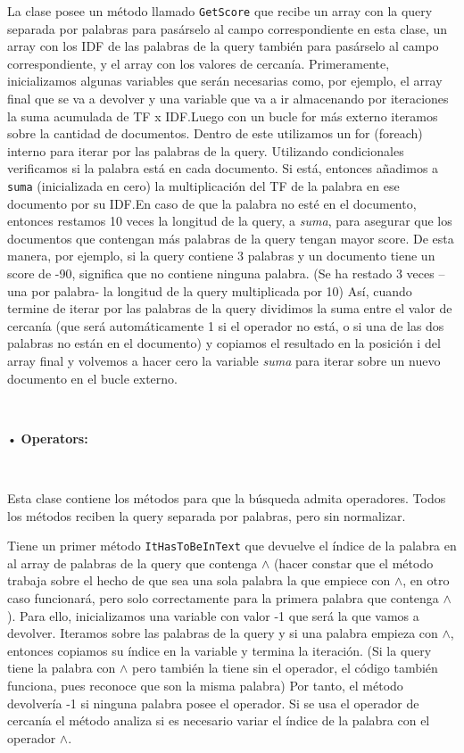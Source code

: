 \documentclass{article}
\begin{document}
La clase posee un método llamado {\texttt{GetScore}} que recibe un array con la query separada por
palabras para pasárselo al campo correspondiente en esta clase, un array con los IDF de las
palabras de la query también para pasárselo al campo correspondiente, y el array con los
valores de cercanía. Primeramente, inicializamos algunas variables que serán necesarias
como, por ejemplo, el array final que se va a devolver y una variable que va a ir almacenando
por iteraciones la suma acumulada de TF x IDF.Luego con un bucle for más externo iteramos
sobre la cantidad de documentos. Dentro de este utilizamos un for (foreach) interno para iterar
por las palabras de la query. Utilizando condicionales verificamos si la palabra está en cada
documento. Si está, entonces añadimos a {\texttt{suma}} (inicializada en cero) la multiplicación del TF
de la palabra en ese documento por su IDF.En caso de que la palabra no esté en el documento,
entonces restamos 10 veces la longitud de la query, a {\textit{suma}}, para asegurar que los
documentos que contengan más palabras de la query tengan mayor score. De esta manera,
por ejemplo, si la query contiene 3 palabras y un documento tiene un score de -90, significa
que no contiene ninguna palabra. (Se ha restado 3 veces –una por palabra- la longitud de la
query multiplicada por 10) Así, cuando termine de iterar por las palabras de la query dividimos
la suma entre el valor de cercanía (que será automáticamente 1 si el operador no está, o si una
de las dos palabras no están en el documento) y copiamos el resultado en la posición i del
array final y volvemos a hacer cero la variable {\textit{suma}} para iterar sobre un nuevo documento
en el bucle externo.


\


• \textbf{Operators:}

\


Esta clase contiene los métodos para que la búsqueda admita operadores. Todos los métodos
reciben la query separada por palabras, pero sin normalizar.


Tiene un primer método {\texttt{ItHasToBeInText}} que devuelve el índice de la palabra en al array de
palabras de la query que contenga {\tiny $\land $} (hacer constar que el método trabaja sobre el hecho de
que sea una sola palabra la que empiece con {\tiny $\land $}, en otro caso funcionará, pero solo
correctamente para la primera palabra que contenga {\tiny $\land $}). Para ello, inicializamos una variable
con valor -1 que será la que vamos a devolver. Iteramos sobre las palabras de la query y si una
palabra empieza con {\tiny $\land $}, entonces copiamos su índice en la variable y termina la iteración. (Si
la query tiene la palabra con {\tiny $\land $} pero también la tiene sin el operador, el código también funciona,
pues reconoce que son la misma palabra) Por tanto, el método devolvería -1 si ninguna palabra
posee el operador. Si se usa el operador de cercanía el método analiza si es necesario variar
el índice de la palabra con el operador {\tiny $\land $}.
\end{document}
